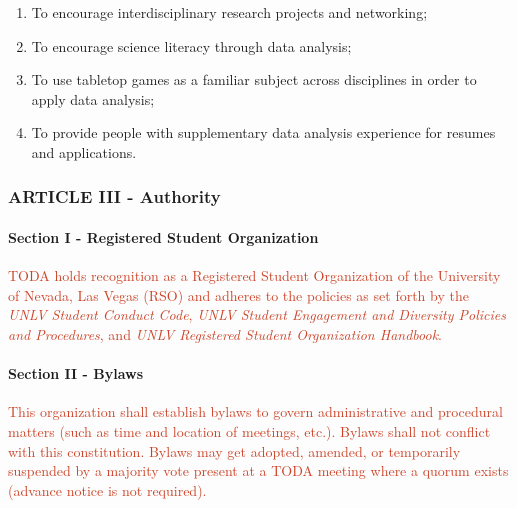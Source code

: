 \documentclass[12pt]{report}
\begin{document}
\begin{enumerate}
	\item To encourage interdisciplinary research projects and networking;\par

	\item To encourage science literacy through data analysis;\par

	\item To use tabletop games as a familiar subject across disciplines in order to apply data analysis;\par

	\item To provide people with supplementary data analysis experience for resumes and applications.
\end{enumerate}\par

\subsubsection*{ARTICLE III - Authority}
\paragraph*{Section I - Registered Student Organization}
\begin{adjustwidth}{0.5in}{0.0in}
\textcolor[HTML]{CC4125}{TODA holds recognition as a Registered Student Organization of the University of Nevada, Las Vegas (RSO) and adheres to the policies as set forth by the \textit{UNLV Student Conduct Code}, \textit{UNLV Student Engagement and Diversity Policies and Procedures}, and \textit{UNLV Registered Student Organization Handbook}.}\par

\end{adjustwidth}

\paragraph*{Section II - Bylaws}
\begin{adjustwidth}{0.5in}{0.0in}
\textcolor[HTML]{CC4125}{This organization shall establish bylaws to govern administrative and procedural matters (such as time and location of meetings, etc.). Bylaws shall not conflict with this constitution. Bylaws may get adopted, amended, or temporarily suspended by a majority vote present at a TODA meeting where a quorum exists (advance notice is not required).}\par

\end{adjustwidth}
\end{document}
